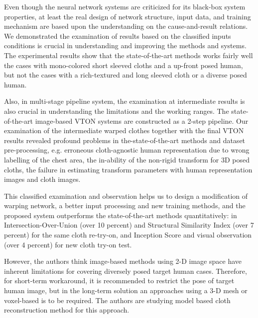 \documentclass[runningheads]{llncs}
\begin{document}
Even though the neural network systems are criticized for its black-box system properties, at least the real design of network structure, input data, and training mechanism are based upon the understanding on the cause-and-result relations. We demonstrated the examination of results based on the classified inputs conditions is crucial in understanding and improving the methods and systems. The experimental results show that the state-of-the-art methods works fairly well the cases with mono-colored short sleeved cloths and a up-front posed human, but not the cases with a rich-textured and long sleeved cloth or a diverse posed human.    

Also, in multi-stage pipeline system, the examination at intermediate results is also crucial in understanding the limitations and the working ranges. The state-of-the-art image-based VTON systems are constructed as a 2-step pipeline. Our examination of the intermediate warped clothes together with the final VTON results revealed profound problems in the-state-of-the-art methods and dataset pre-processing, e.g. erroneous cloth-agnostic human representation due to wrong labelling of the chest area, the in-ability of the non-rigid transform for 3D posed cloths, the failure in estimating transform parameters with human representation images and cloth images.    

This classified examination and observation helps us to design a modification of warping network, a better input processing and new training methods, and the proposed system outperforms the state-of-the-art methods quantitatively: in Intersection-Over-Union (over 10 percent) and Structural Similarity Index (over 7 percent) for the same cloth re-try-on, and Inception Score and visual observation (over 4 percent) for new cloth try-on test.     

However, the authors think image-based methods using 2-D image space have inherent limitations for covering diversely posed target human cases. Therefore, for short-term workaround, it is recommended to restrict the pose of target human image, but in the long-term solution an approaches using a 3-D mesh or voxel-based is to be required. The authors are studying model based cloth reconstruction method for this approach.

     
\clearpage
%
%


\end{document}
